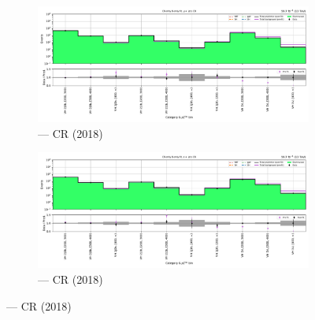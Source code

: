 \begin{figure}[htbp]
    \centering
    \begin{subfigure}[b]{0.49\textwidth}
        \includegraphics[width=\textwidth]{chapters/higgstoinv/figures/mountain_ranges/2018/VH/Wmunu_tree_fit_b-abs_values_VH_cats.pdf}
        \caption{\VH --- \singleMuCr \gls{CR} (2018)}
    \end{subfigure}
    \hfill
    \begin{subfigure}[b]{0.49\textwidth}
        \includegraphics[width=\textwidth]{chapters/higgstoinv/figures/mountain_ranges/2018/VH/Wenu_tree_fit_b-abs_values_VH_cats.pdf}
        \caption{\VH --- \singleEleCr \gls{CR} (2018)}
    \end{subfigure}


\end{figure}
